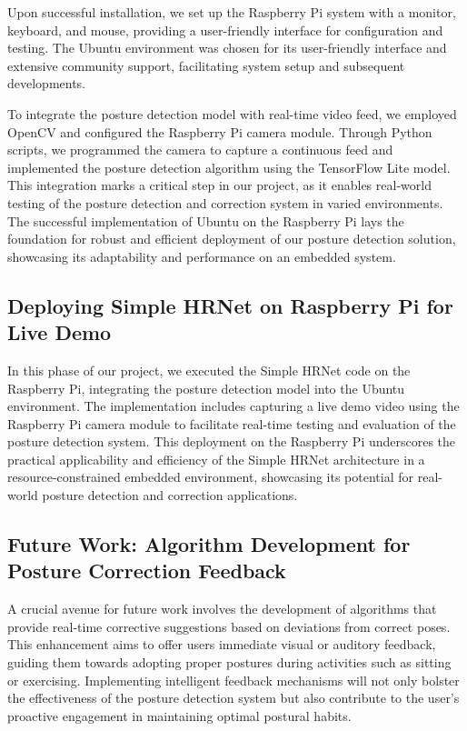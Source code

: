 \documentclass{article}
\begin{document}
Upon successful installation, we set up the Raspberry Pi system with a monitor, keyboard, and mouse, providing a user-friendly interface for configuration and testing. The Ubuntu environment was chosen for its user-friendly interface and extensive community support, facilitating system setup and subsequent developments.

To integrate the posture detection model with real-time video feed, we employed OpenCV and configured the Raspberry Pi camera module. Through Python scripts, we programmed the camera to capture a continuous feed and implemented the posture detection algorithm using the TensorFlow Lite model. This integration marks a critical step in our project, as it enables real-world testing of the posture detection and correction system in varied environments. The successful implementation of Ubuntu on the Raspberry Pi lays the foundation for robust and efficient deployment of our posture detection solution, showcasing its adaptability and performance on an embedded system.

\subsection{Deploying Simple HRNet on Raspberry Pi for Live Demo}
In this phase of our project, we executed the Simple HRNet code on the Raspberry Pi, integrating the posture detection model into the Ubuntu environment. The implementation includes capturing a live demo video using the Raspberry Pi camera module to facilitate real-time testing and evaluation of the posture detection system. This deployment on the Raspberry Pi underscores the practical applicability and efficiency of the Simple HRNet architecture in a resource-constrained embedded environment, showcasing its potential for real-world posture detection and correction applications.


\subsection{Future Work: Algorithm Development for Posture Correction Feedback}
A crucial avenue for future work involves the development of algorithms that provide real-time corrective suggestions based on deviations from correct poses. This enhancement aims to offer users immediate visual or auditory feedback, guiding them towards adopting proper postures during activities such as sitting or exercising. Implementing intelligent feedback mechanisms will not only bolster the effectiveness of the posture detection system but also contribute to the user's proactive engagement in maintaining optimal postural habits.
\end{document}
